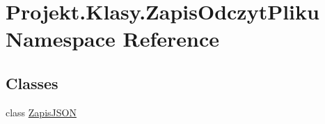 \hypertarget{namespace_projekt_1_1_klasy_1_1_zapis_odczyt_pliku}{}\section{Projekt.\+Klasy.\+Zapis\+Odczyt\+Pliku Namespace Reference}
\label{namespace_projekt_1_1_klasy_1_1_zapis_odczyt_pliku}
\subsection*{Classes}
\begin{DoxyCompactItemize}
\item 
class \mbox{\hyperlink{class_projekt_1_1_klasy_1_1_zapis_odczyt_pliku_1_1_zapis_j_s_o_n}{Zapis\+J\+S\+ON}}
\end{DoxyCompactItemize}
